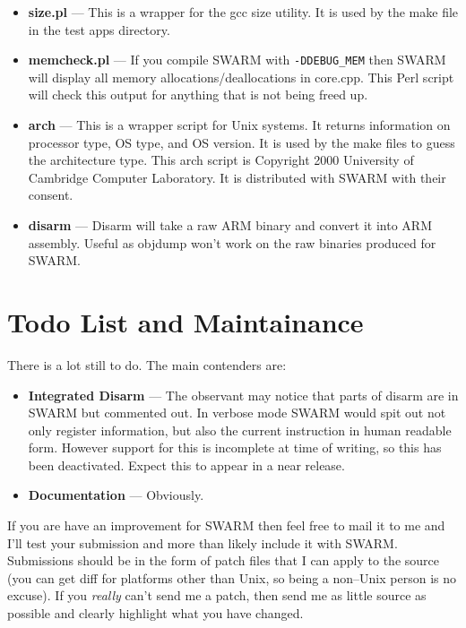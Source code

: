 \documentclass[10pt,a4paper]{article}
\begin{document}
\begin{itemize}
\itemsep 0pt
\parsep 0pt

\item \textbf{size.pl} --- This is a wrapper for the gcc size
utility. It is used by the make file in the test apps directory. 
\item \textbf{memcheck.pl} --- If you compile SWARM with
\texttt{-DDEBUG\_MEM} then SWARM will display all memory
allocations/deallocations in core.cpp. This Perl script will check
this output for anything that is not being freed up.
\item \textbf{arch} --- This is a wrapper script for Unix systems. It
returns information on processor type, OS type, and OS version. It is
used by the make files to guess the architecture type. This arch
script is Copyright 2000  University of Cambridge Computer Laboratory. It is
distributed with SWARM with their consent.
\item \textbf{disarm} --- Disarm will take a raw ARM binary and
convert it into ARM assembly. Useful as objdump won't work on the raw
binaries produced for SWARM.
\end{itemize}



\section{Todo List and Maintainance} %
\label{sec:todo}    %

There is a lot still to do. The main contenders are:

\begin{itemize}
\itemsep 0pt
\parsep 0pt
\item \textbf{Integrated Disarm} --- The observant may notice that
parts of disarm are in SWARM but commented out. In verbose mode SWARM
would spit out not only register information, but also the current 
instruction in human readable form. However support for this is
incomplete at time of writing, so this has been deactivated. Expect
this to appear in a near release.
\item \textbf{Documentation} --- Obviously.
\end{itemize}

If you are have an improvement for SWARM then feel free to mail it to
me and I'll test your submission and more than likely include it with
SWARM. Submissions should be in the form of patch files that I can
apply to the source (you can get diff for platforms other than Unix,
so being a non--Unix person is no excuse). If you \emph{really} can't send
me a patch, then send me as little source as possible and clearly
highlight what you have changed.
\end{document}
